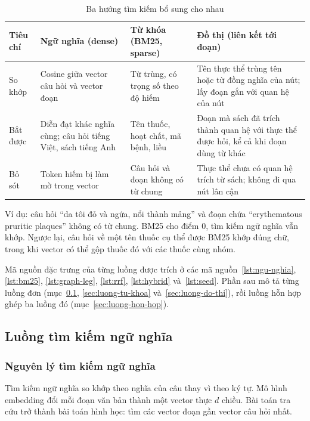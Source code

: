 \begin{table}[H]
\centering
\caption{Ba hướng tìm kiếm bổ sung cho nhau}
\label{tab:bu-dap}
\small
\begin{tabular}{|p{2.0cm}|p{3.8cm}|p{3.8cm}|p{3.9cm}|}
\hline
\textbf{Tiêu chí} & \textbf{Ngữ nghĩa (dense)} & \textbf{Từ khóa (BM25, sparse)} & \textbf{Đồ thị (liên kết tới đoạn)} \\ \hline
So khớp & Cosine giữa vector câu hỏi và vector đoạn & Từ trùng, có trọng số theo độ hiếm & Tên thực thể trùng tên hoặc từ đồng nghĩa của nút; lấy đoạn gắn với quan hệ của nút \\ \hline
Bắt được & Diễn đạt khác nghĩa cùng; câu hỏi tiếng Việt, sách tiếng Anh & Tên thuốc, hoạt chất, mã bệnh, liều & Đoạn mà sách đã trích thành quan hệ với thực thể được hỏi, kể cả khi đoạn dùng từ khác \\ \hline
Bỏ sót & Token hiếm bị làm mờ trong vector & Câu hỏi và đoạn không có từ chung & Thực thể chưa có quan hệ trích từ sách; không đi qua nút lân cận \\ \hline
\end{tabular}
\end{table}

Ví dụ: câu hỏi ``da tôi đỏ và ngứa, nổi thành mảng'' và đoạn chứa ``erythematous pruritic plaques'' không có từ chung. BM25 cho điểm $0$, tìm kiếm ngữ nghĩa vẫn khớp. Ngược lại, câu hỏi về một tên thuốc cụ thể được BM25 khớp đúng chữ, trong khi vector có thể gộp thuốc đó với các thuốc cùng nhóm.


Mã nguồn đặc trưng của từng luồng được trích ở các mã nguồn~\ref{lst:ngu-nghia}, \ref{lst:bm25}, \ref{lst:graph-leg}, \ref{lst:rrf}, \ref{lst:hybrid} và~\ref{lst:seed}. Phần sau mô tả từng luồng đơn (mục~\ref{sec:luong-ngu-nghia}, \ref{sec:luong-tu-khoa} và~\ref{sec:luong-do-thi}), rồi luồng hỗn hợp ghép ba luồng đó (mục~\ref{sec:luong-hon-hop}).

\subsection{Luồng tìm kiếm ngữ nghĩa}
\label{sec:luong-ngu-nghia}

\subsubsection{Nguyên lý tìm kiếm ngữ nghĩa}

Tìm kiếm ngữ nghĩa so khớp theo nghĩa của câu thay vì theo ký tự. Mô hình embedding đổi mỗi đoạn văn bản thành một vector thực $d$ chiều. Bài toán tra cứu trở thành bài toán hình học: tìm các vector đoạn gần vector câu hỏi nhất.

